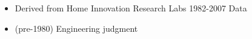 \begin{itemize}
\item Derived from Home Innovation Research Labs 1982-2007 Data
\item (pre-1980) Engineering judgment
\end{itemize}
